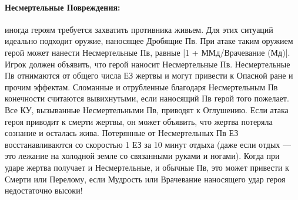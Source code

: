 \paragraph{Несмертельные Повреждения:} иногда героям требуется захватить противника живьем. Для этих ситуаций идеально подходит оружие, наносящее Дробящие Пв. При атаке таким оружием герой может нанести Несмертельные Пв, равные |1 + ММд/Врачевание (Мд)|. Игрок должен объявить, что герой наносит Несмертельные Пв.
Несмертельные Пв отнимаются от общего числа ЕЗ жертвы и могут привести к Опасной ране и прочим эффектам. Сломанные и отрубленные благодаря Несмертельным Пв конечности считаются вывихнутыми, если наносящий Пв герой того пожелает. Все КУ, вызыванные Несмертельными Пв, приводят к Оглушению. Если атака героя приводит к смерти жертвы, он может объявить, что жертва потеряла сознание и осталась жива. Потерянные от Несмертельных Пв ЕЗ восстанавливаются со скоростью 1 ЕЗ за 10 минут отдыха (даже если отдых — это лежание на холодной земле со связанными руками и ногами).
\newline
Когда при ударе жертва получает и Несмертельные, и обычные Пв, это может привести к Смерти или Перелому, если Мудрость или Врачевание наносящего удар героя недостаточно высоки!
